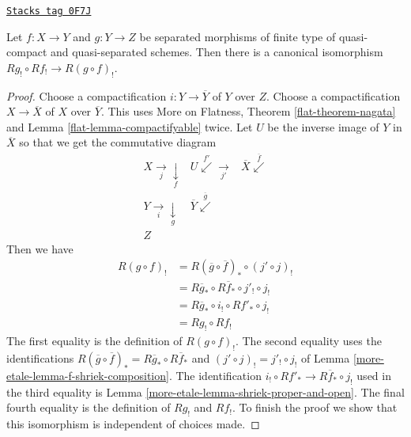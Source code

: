 \begin{lemma}
\label{more-etale-lemma-shriek-composition}
\href{https://stacks.math.columbia.edu/tag/0F7J}{\texttt{Stacks tag 0F7J}}

Let $f : X \to Y$ and $g : Y \to Z$ be separated morphisms of finite type
of quasi-compact and quasi-separated schemes. Then there is a canonical
isomorphism $Rg_! \circ Rf_! \to R(g \circ f)_!$.
\end{lemma}

\begin{proof}
Choose a compactification $i : Y \to \overline{Y}$ of $Y$ over $Z$.
Choose a compactification $X \to \overline{X}$ of $X$ over
$\overline{Y}$. This uses More on Flatness, Theorem \ref{flat-theorem-nagata}
and Lemma \ref{flat-lemma-compactifyable} twice.
Let $U$ be the inverse image of $Y$ in $\overline{X}$
so that we get the commutative diagram
$$
\begin{array}{ccc}X \underset{j}{\longrightarrow}\underset{f}{\downarrow} & U \overset{f'}{\swarrow}\underset{j'}{\longrightarrow} & \overline{X} \overset{\overline{f}}{\swarrow} \\ Y \underset{i}{\longrightarrow}\underset{g}{\downarrow} & \overline{Y} \overset{\overline{g}}{\swarrow} &  \\ Z &  & \end{array}
$$
Then we have
\begin{align*}
R(g \circ f)_!
& =
R(\overline{g} \circ \overline{f})_* \circ (j' \circ j)_! \\
& =
R\overline{g}_* \circ R\overline{f}_* \circ j'_! \circ j_! \\
& =
R\overline{g}_* \circ i_! \circ Rf'_* \circ j_! \\
& =
Rg_! \circ Rf_!
\end{align*}
The first equality is the definition of $R(g \circ f)_!$.
The second equality uses the identifications
$R(\overline{g} \circ \overline{f})_* = R\overline{g}_* \circ R\overline{f}_*$
and $(j' \circ j)_! = j'_! \circ j_!$ of Lemma \ref{more-etale-lemma-f-shriek-composition}.
The identification $i_! \circ Rf'_* \to R\overline{f}_* \circ j_!$
used in the third equality is Lemma \ref{more-etale-lemma-shriek-proper-and-open}.
The final fourth equality is the definition of $Rg_!$ and $Rf_!$.
To finish the proof we show that
this isomorphism is independent of choices made.


\end{proof}
